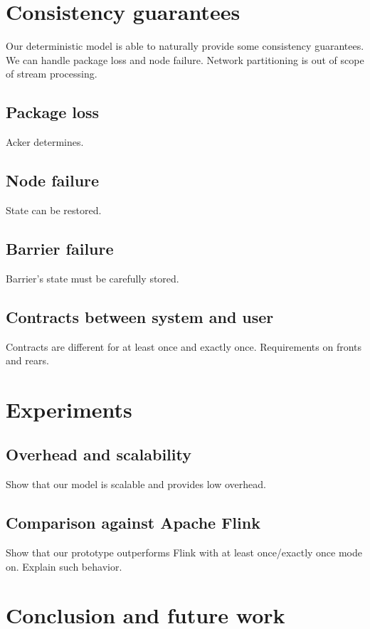 \documentclass{llncs}
\begin{document}
\section{Consistency guarantees}

Our deterministic model is able to naturally provide some consistency guarantees. We can handle package loss and node failure. Network partitioning is out of scope of stream processing.

\subsection{Package loss}
Acker determines.

\subsection{Node failure}
State can be restored.

\subsection{Barrier failure}
Barrier's state must be carefully stored.

\subsection{Contracts between system and user}
Contracts are different for at least once and exactly once. Requirements on fronts and rears.

\section {Experiments}

\subsection{Overhead and scalability}
Show that our model is scalable and provides low overhead.

\subsection{Comparison against Apache Flink}
Show that our prototype outperforms Flink with at least once/exactly once mode on. Explain such behavior.

\section {Conclusion and future work}



\end{document}
